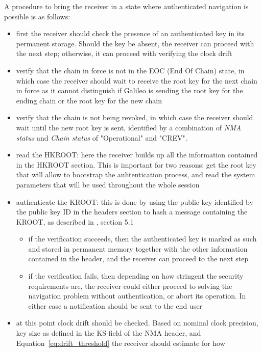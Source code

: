 A procedure to bring the receiver in a state where authenticated navigation is
possible is as follows:
\begin{itemize}
  \item first the receiver should check the presence of an authenticated key in
    its permanent storage. Should the key be absent, the receiver can proceed
    with the next step; otherwise, it can proceed with verifying the clock drift
  \item verify that the chain in force is not in the EOC (End Of Chain) state,
    in which case the receiver should wait to receive the root key for the next
    chain in force as it cannot distinguish if Galileo is sending the root key
    for the ending chain or the root key for the new chain
  \item verify that the chain is not being revoked, in which case the receiver
    should wait until the new root key is sent, identified by a combination of
    \textit{NMA status} and \textit{Chain status} of "Operational" and "CREV".
  \item read the HKROOT: here the receiver builds up all the information contained
    in the HKROOT section. This is important for two reasons: get the root key
    that will allow to bootstrap the auhtentication process, and read the system
    parameters that will be used throughout the whole session
  \item authenticate the KROOT: this is done by using the public key identified
    by the public key ID in the headers section to hash a message containing the
    KROOT, as described in \cite{osnma}, section 5.1
    \begin{itemize}
      \item if the verification succeeds, then the authenticated key is marked
        as such and stored in permanent memory together with the other
        information contained in the header, and the receiver can proceed to
        the next step
      \item if the verification fails, then depending on how stringent the
        security requirements are, the receiver could either proceed to 
        solving the navigation problem without authentication, or abort its
        operation. In either case a notification should be sent to the end user
    \end{itemize}
  \item at this point clock drift should be checked. Based on nominal clock
    precision, key size as defined in the \textrm{KS} field of the NMA header,
    and Equation~\ref{eq:drift_threshold} the receiver should estimate for how

\end{itemize}
